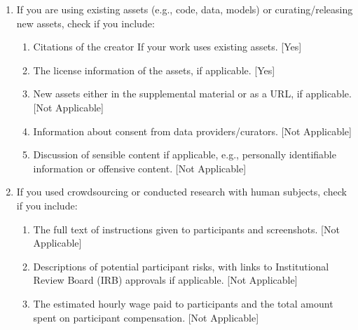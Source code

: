 \documentclass[twoside]{article}
\begin{document}
\begin{enumerate}
 \item If you are using existing assets (e.g., code, data, models) or curating/releasing new assets, check if you include:
 \begin{enumerate}
   \item Citations of the creator If your work uses existing assets. [Yes]
   \item The license information of the assets, if applicable. [Yes]
   \item New assets either in the supplemental material or as a URL, if applicable. [Not Applicable]
   \item Information about consent from data providers/curators. [Not Applicable]
   \item Discussion of sensible content if applicable, e.g., personally identifiable information or offensive content. [Not Applicable]
 \end{enumerate}

 \item If you used crowdsourcing or conducted research with human subjects, check if you include:
 \begin{enumerate}
   \item The full text of instructions given to participants and screenshots. [Not Applicable]
   \item Descriptions of potential participant risks, with links to Institutional Review Board (IRB) approvals if applicable. [Not Applicable]
   \item The estimated hourly wage paid to participants and the total amount spent on participant compensation. [Not Applicable]
 \end{enumerate}

 \end{enumerate}

\end{document}
